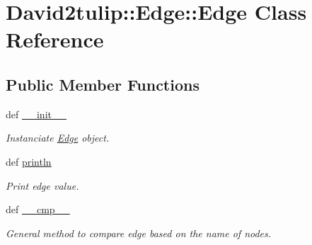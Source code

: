 \hypertarget{classDavid2tulip_1_1Edge_1_1Edge}{
\section{\-David2tulip\-:\-:\-Edge\-:\-:\-Edge \-Class \-Reference}
\label{classDavid2tulip_1_1Edge_1_1Edge}
}
\subsection*{\-Public \-Member \-Functions}
\begin{DoxyCompactItemize}
\item 
def \hyperlink{classDavid2tulip_1_1Edge_1_1Edge_a65e8d9fd17b81971c7aba3f6766cdab7}{\-\_\-\-\_\-init\-\_\-\-\_\-}
\begin{DoxyCompactList}\small\item\em \-Instanciate \hyperlink{classDavid2tulip_1_1Edge_1_1Edge}{\-Edge} object. \end{DoxyCompactList}\item 
def \hyperlink{classDavid2tulip_1_1Edge_1_1Edge_a58e48290ac5f50c00a251994f53d2381}{println}
\begin{DoxyCompactList}\small\item\em \-Print edge value. \end{DoxyCompactList}\item 
def \hyperlink{classDavid2tulip_1_1Edge_1_1Edge_a2ae07b94fb26586708d7e675f93d312a}{\-\_\-\-\_\-cmp\-\_\-\-\_\-}
\begin{DoxyCompactList}\small\item\em \-General method to compare edge based on the name of nodes. \end{DoxyCompactList}\end{DoxyCompactItemize}
